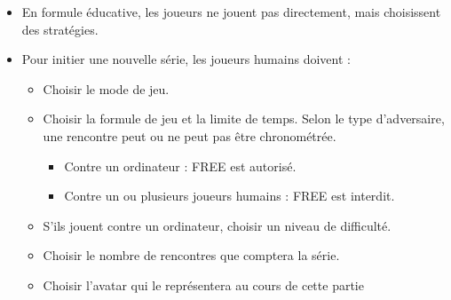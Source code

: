 \begin{itemize}
        \item En formule éducative, les joueurs ne jouent pas directement, mais choisissent des stratégies.
        \item Pour initier une nouvelle série, les joueurs humains doivent :
            \begin{itemize}
                \item Choisir le mode de jeu.
                \item Choisir la formule de jeu et la limite de temps.\newline
                      Selon le type d'adversaire, une rencontre peut ou ne peut pas être chronométrée.
                    \begin{itemize}
                        \item Contre un ordinateur : FREE est autorisé.
                        \item Contre un ou plusieurs joueurs humains : FREE est interdit.
                    \end{itemize}
                \item S'ils jouent contre un ordinateur, choisir un niveau de difficulté.
                \item Choisir le nombre de rencontres que comptera la série.
                \item Choisir l'avatar qui le représentera au cours de cette partie
            \end{itemize}
    \end{itemize}
    
